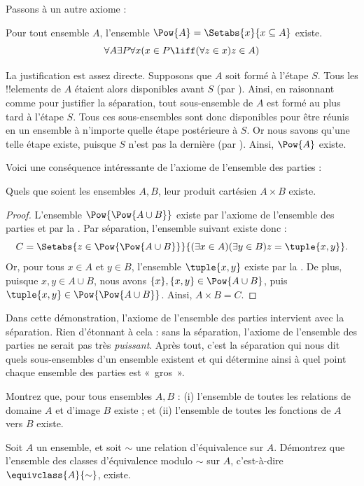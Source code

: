 \documentclass[../../../include/open-logic-section]{subfiles}
\begin{document}

Passons à un autre axiome :

\begin{axiom}
Pour tout ensemble $A$, l'ensemble
$\Pow{A} = \Setabs{x}{x \subseteq A}$ existe.
\[
	\forall A \exists P \forall x(x \in P \liff (\forall z \in x)z \in A)
\]
\end{axiom}

La justification est assez directe. Supposons que $A$ soit formé à
l'étape $S$. Tous les !!{element}s de $A$ étaient alors disponibles
avant $S$ (par \stagesacc). Ainsi, en raisonnant comme pour justifier
la séparation, tout sous-ensemble de $A$ est formé au plus tard à
l'étape $S$. Tous ces sous-ensembles sont donc disponibles pour être
réunis en un ensemble à n'importe quelle étape postérieure à $S$.
Or nous savons qu'une telle étape existe, puisque $S$ n'est pas la
dernière (par \stagessucc). Ainsi, $\Pow{A}$ existe.

Voici une conséquence intéressante de l'axiome de l'ensemble des
parties :

\begin{prop}\label{thm:Products}
Quels que soient les ensembles $A, B$, leur produit cartésien
$A \times B$ existe.
\end{prop}

\begin{proof}
L'ensemble $\Pow{\Pow{A \cup B}}$ existe par l'axiome de l'ensemble
des parties et par la
. Par séparation,
l'ensemble suivant existe donc :
\[
	C = \Setabs{z \in \Pow{\Pow{A \cup B}}}{(\exists x \in A)(\exists y \in B) z = \tuple{x, y}}.
\]
Or, pour tous $x \in A$ et $y \in B$, l'ensemble $\tuple{x, y}$ existe
par la . De plus, puisque
$x, y \in A \cup B$, nous avons
$\{x\}, \{x, y\} \in \Pow{A \cup B}$, puis
$\tuple{x,y} \in \Pow{\Pow{A \cup B}}$. Ainsi, $A \times B = C$.
\end{proof}

Dans cette démonstration, l'axiome de l'ensemble des parties intervient
avec la séparation. Rien d'étonnant à cela : sans la séparation,
l'axiome de l'ensemble des parties ne serait pas très \emph{puissant}.
Après tout, c'est la séparation qui nous dit quels sous-ensembles d'un
ensemble existent et qui détermine ainsi à quel point chaque ensemble
des parties est «~gros~».

\begin{prob}
Montrez que, pour tous ensembles $A, B$ : (i) l'ensemble de toutes
les relations de domaine $A$ et d'image $B$ existe ; et (ii)
l'ensemble de toutes les fonctions de $A$ vers $B$ existe.
\end{prob}

\begin{prob}
Soit $A$ un ensemble, et soit $\sim$ une relation d'équivalence sur
$A$. Démontrez que l'ensemble des classes d'équivalence modulo
$\sim$ sur $A$, c'est-à-dire $\equivclass{A}{\sim}$, existe.
\end{prob}
\end{document}
